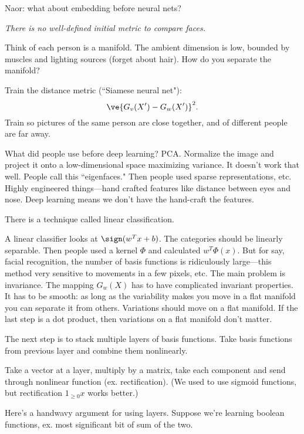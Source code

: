 
Naor: what about embedding before neural nets?

\emph{There is no well-defined initial metric to compare faces.}

Think of each person is a manifold. The ambient dimension is low, bounded by muscles and lighting sources (forget about hair). How do you separate the manifold?

Train the distance metric (``Siamese neural net"):
\[
\ve{G_v(X')-G_w(X')}^2.
\]
Train so pictures of the same person are close together, and of different people are far away.

What did people use before deep learning? PCA. Normalize the image and project it onto a low-dimensional space maximizing variance. It doesn't work that well. People call this ``eigenfaces." Then people used sparse representations, etc. Highly engineered things---hand crafted features like distance between eyes and nose. Deep learning means we don't have the hand-craft the features.

There is a technique called linear classification.

A linear classifier looks at $\sign(w^Tx+b)$. The categories should be linearly separable. Then people used a kernel $\Phi$ and calculated $w^T\Phi(x)$. But for say, facial recognition, the number of basis functions is ridiculously large---this method very sensitive to movements in a few pixels, etc. The main problem is invariance. The mapping $G_w(X)$ has to have complicated invariant properties. It has to be smooth: as long as the variability makes you move in a flat manifold you can separate it from others.
Variations should move on a flat manifold. If the last step is a dot product, then variations on a flat manifold don't matter.

The next step is to stack multiple layers of basis functions. Take basis functions from previous layer and combine them nonlinearly. 

Take a vector at a layer, multiply by a matrix, take each component and send through nonlinear function (ex. rectification). (We used to use sigmoid functions, but rectification $1_{\ge 0}x$ works better.)

Here's a handwavy argument for using layers. Suppose we're learning boolean functions, ex. most significant bit of sum of the two.

